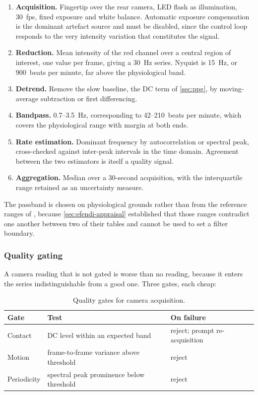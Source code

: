 \documentclass[12pt,a4paper,oneside]{report}
\begin{document}
\begin{enumerate}[nosep,label=\arabic*.]
  \item \textbf{Acquisition.} Fingertip over the rear camera, LED flash as illumination, 30~fps, fixed exposure and white balance. Automatic exposure compensation is the dominant artefact source and must be disabled, since the control loop responds to the very intensity variation that constitutes the signal.
  \item \textbf{Reduction.} Mean intensity of the red channel over a central region of interest, one value per frame, giving a 30~Hz series. Nyquist is 15~Hz, or 900~beats per minute, far above the physiological band.
  \item \textbf{Detrend.} Remove the slow baseline, the DC term of \cref{sec:ppg}, by moving-average subtraction or first differencing.
  \item \textbf{Bandpass.} 0.7--3.5~Hz, corresponding to 42--210~beats per minute, which covers the physiological range with margin at both ends.
  \item \textbf{Rate estimation.} Dominant frequency by autocorrelation or spectral peak, cross-checked against inter-peak intervals in the time domain. Agreement between the two estimators is itself a quality signal.
  \item \textbf{Aggregation.} Median over a 30-second acquisition, with the interquartile range retained as an uncertainty measure.
\end{enumerate}

The passband is chosen on physiological grounds rather than from the reference ranges of \textcite{efendi2025}, because \cref{sec:efendi-appraisal} established that those ranges contradict one another between two of their tables and cannot be used to set a filter boundary.

\subsubsection{Quality gating}

A camera reading that is not gated is worse than no reading, because it enters the series indistinguishable from a good one. Three gates, each cheap:

\begin{table}[htbp]
\centering\small
\caption{Quality gates for camera acquisition.}\label{tab:ppg-gates}
\begin{tabularx}{\textwidth}{@{}>{\raggedright\arraybackslash}p{2.4cm} X >{\raggedright\arraybackslash}p{3.4cm}@{}}
\toprule
\textbf{Gate} & \textbf{Test} & \textbf{On failure} \\
\midrule
Contact & DC level within an expected band & reject; prompt re-acquisition \\
Motion & frame-to-frame variance above threshold & reject \\
Periodicity & spectral peak prominence below threshold & reject \\
\bottomrule
\end{tabularx}
\end{table}
\end{document}
